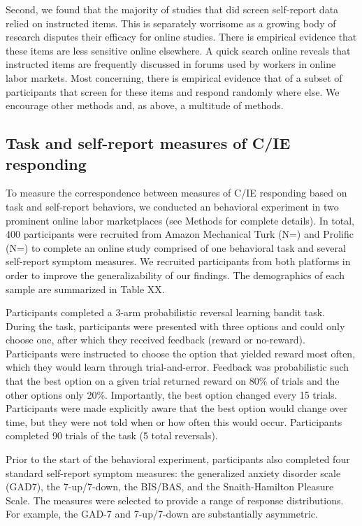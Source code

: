 \documentclass[a4paper,notitlepage,12pt]{article}
\begin{document}
Second, we found that the majority of studies that did screen self-report data relied on instructed items. This is separately worrisome as a growing body of research disputes their efficacy for online studies. There is empirical evidence that these items are less sensitive online elsewhere. A quick search online reveals that instructed items are frequently discussed in forums used by workers in online labor markets. Most concerning, there is empirical evidence that of a subset of participants that screen for these items and respond randomly where else. We encourage other methods and, as above, a multitude of methods. 

\subsection{Task and self-report measures of C/IE responding}

To measure the correspondence between measures of C/IE responding based on task and self-report behaviors, we conducted an behavioral experiment in two prominent online labor marketplaces (see Methods for complete details). In total, 400 participants were recruited from Amazon Mechanical Turk (N=) and Prolific (N=) to complete an online study comprised of one behavioral task and several self-report symptom measures. We recruited participants from both platforms in order to improve the generalizability of our findings. The demographics of each sample are summarized in Table XX. 

Participants completed a 3-arm probabilistic reversal learning bandit task. During the task, participants were presented with three options and could only choose one, after which they received feedback (reward or no-reward). Participants were instructed to choose the option that yielded reward most often, which they would learn through trial-and-error. Feedback was probabilistic such that the best option on a given trial returned reward on 80\% of trials and the other options only 20\%. Importantly, the best option changed every 15 trials. Participants were made explicitly aware that the best option would change over time, but they were not told when or how often this would occur. Participants completed 90 trials of the task (5 total reversals). 
 
Prior to the start of the behavioral experiment, participants also completed four standard self-report symptom measures: the generalized anxiety disorder scale (GAD7), the 7-up/7-down, the BIS/BAS, and the Snaith-Hamilton Pleasure Scale. The measures were selected to provide a range of response distributions. For example, the GAD-7 and 7-up/7-down are substantially asymmetric.
\end{document}
